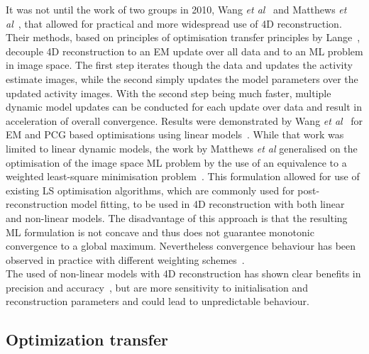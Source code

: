 It was not until the work of two groups in 2010, Wang \textit{et al}~\cite{Wang2010} and Matthews \textit{et al}~\cite{Matthews2010}, that allowed for practical and more widespread use of 4D reconstruction. Their methods, based on principles of optimisation transfer principles by Lange~\cite{Lange2000}, decouple 4D reconstruction to an EM update over all data and to an ML problem in image space. The first step iterates though the data and updates the activity estimate images, while the second simply updates the model parameters over the  updated activity images. With the second step being much faster, multiple dynamic model updates can be conducted for each update over data and result in acceleration of overall convergence. Results were demonstrated by Wang \textit{et al}~\cite{Wang2010} for EM and PCG based optimisations using linear models~\cite{Wang2010}. While that work was limited to linear dynamic models, the work by Matthews \textit{et al} generalised on the optimisation of the image space ML problem by the use of an equivalence to a weighted least-square minimisation problem~\cite{Matthews2010}. This formulation allowed for use of existing LS optimisation algorithms, which are commonly used for post-reconstruction model fitting, to be used in 4D reconstruction with both linear and non-linear models. The disadvantage of this approach is that the resulting ML formulation is not concave and thus does not guarantee monotonic convergence to a global maximum. Nevertheless convergence behaviour has been observed in practice with different weighting schemes~\cite{Gravel2015,Wang2013}. \\
The used of non-linear models with 4D reconstruction has shown clear benefits in precision and accuracy~\cite{Angelis2014,Kotasidis2012}, but are more sensitivity to initialisation and reconstruction parameters and could lead to unpredictable behaviour.



\subsection{Optimization transfer}
%

